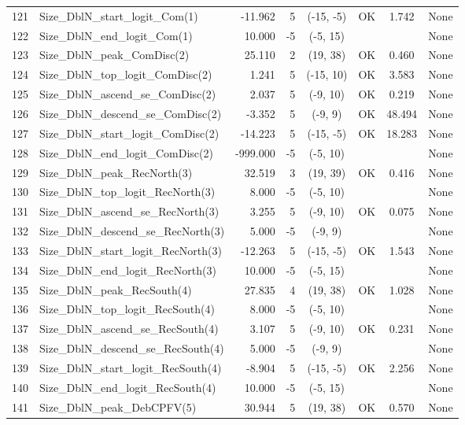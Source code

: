 \documentclass[12pt,]{article}
\begin{document}
\begin{landscape}
\begin{longtable}{rlrrcccp{1.5in}}
  121 & Size\_DblN\_start\_logit\_Com(1) & -11.962 & 5 & (-15, -5) & OK & 1.742 & None \\ 
  122 & Size\_DblN\_end\_logit\_Com(1) & 10.000 & -5 & (-5, 15) &  &  & None \\ 
  123 & Size\_DblN\_peak\_ComDisc(2) & 25.110 & 2 & (19, 38) & OK & 0.460 & None \\ 
  124 & Size\_DblN\_top\_logit\_ComDisc(2) & 1.241 & 5 & (-15, 10) & OK & 3.583 & None \\ 
  125 & Size\_DblN\_ascend\_se\_ComDisc(2) & 2.037 & 5 & (-9, 10) & OK & 0.219 & None \\ 
  126 & Size\_DblN\_descend\_se\_ComDisc(2) & -3.352 & 5 & (-9, 9) & OK & 48.494 & None \\ 
  127 & Size\_DblN\_start\_logit\_ComDisc(2) & -14.223 & 5 & (-15, -5) & OK & 18.283 & None \\ 
  128 & Size\_DblN\_end\_logit\_ComDisc(2) & -999.000 & -5 & (-5, 10) &  &  & None \\ 
  129 & Size\_DblN\_peak\_RecNorth(3) & 32.519 & 3 & (19, 39) & OK & 0.416 & None \\ 
  130 & Size\_DblN\_top\_logit\_RecNorth(3) & 8.000 & -5 & (-5, 10) &  &  & None \\ 
  131 & Size\_DblN\_ascend\_se\_RecNorth(3) & 3.255 & 5 & (-9, 10) & OK & 0.075 & None \\ 
  132 & Size\_DblN\_descend\_se\_RecNorth(3) & 5.000 & -5 & (-9, 9) &  &  & None \\ 
  133 & Size\_DblN\_start\_logit\_RecNorth(3) & -12.263 & 5 & (-15, -5) & OK & 1.543 & None \\ 
  134 & Size\_DblN\_end\_logit\_RecNorth(3) & 10.000 & -5 & (-5, 15) &  &  & None \\ 
  135 & Size\_DblN\_peak\_RecSouth(4) & 27.835 & 4 & (19, 38) & OK & 1.028 & None \\ 
  136 & Size\_DblN\_top\_logit\_RecSouth(4) & 8.000 & -5 & (-5, 10) &  &  & None \\ 
  137 & Size\_DblN\_ascend\_se\_RecSouth(4) & 3.107 & 5 & (-9, 10) & OK & 0.231 & None \\ 
  138 & Size\_DblN\_descend\_se\_RecSouth(4) & 5.000 & -5 & (-9, 9) &  &  & None \\ 
  139 & Size\_DblN\_start\_logit\_RecSouth(4) & -8.904 & 5 & (-15, -5) & OK & 2.256 & None \\ 
  140 & Size\_DblN\_end\_logit\_RecSouth(4) & 10.000 & -5 & (-5, 15) &  &  & None \\ 
  141 & Size\_DblN\_peak\_DebCPFV(5) & 30.944 & 5 & (19, 38) & OK & 0.570 & None \\ 

\end{longtable}
\end{landscape}
\end{document}
